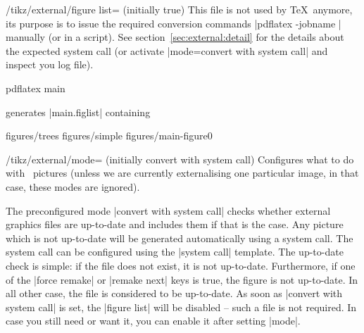 {\begin{key}{/tikz/external/figure list= (initially true)}
	This file is not used by \TeX\ anymore, its purpose is to issue the required conversion commands |pdflatex -jobname |  manually (or in a script). See section~\ref{sec:external:detail} for the details about the expected system call (or activate |mode=convert with system call| and inspect you log file).


\begin{codeexample}
pdflatex main
\end{codeexample}
generates |main.figlist| containing
\begin{codeexample}
figures/trees
figures/simple
figures/main-figure0
\end{codeexample}
\end{key}

\begin{key}{/tikz/external/mode= (initially convert with system call)}
	Configures what to do with \tikzname\ pictures (unless we are currently externalising one particular image, in that case, these modes are ignored).

	The preconfigured mode |convert with system call| checks whether external graphics files are up-to-date and includes them if that is the case. Any picture which is not up-to-date will be generated automatically using a system call. The system call can be configured using the |system call| template. The up-to-date check is simple: if the file does not exist, it is not up-to-date. Furthermore, if one of the |force remake| or |remake next| keys is true, the figure is not up-to-date. In all other case, the file is considered to be up-to-date. As soon as |convert with system call| is set, the |figure list| will be disabled -- such a file is not required. In case you still need or want it, you can enable it after setting |mode|.


\end{key}}
